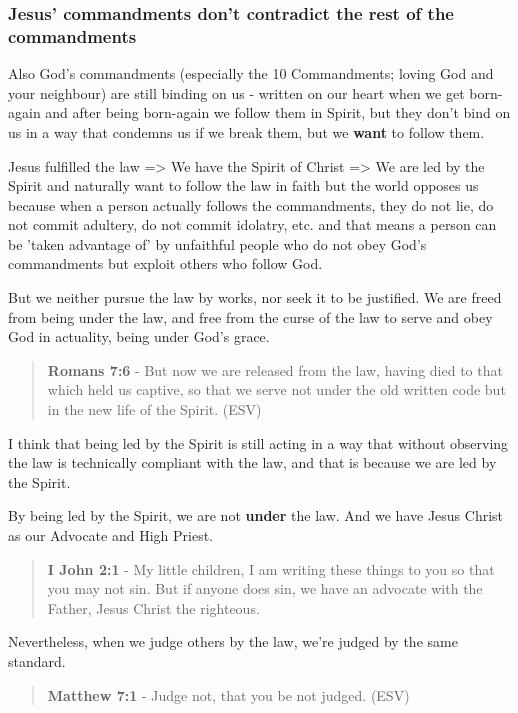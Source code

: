\documentclass[11pt]{article}
\begin{document}
\subsubsection{Jesus' commandments don't contradict the rest of the commandments}
\label{sec:org19095ba}
Also God's commandments (especially the 10 Commandments; loving God and your neighbour) are still binding on us - written on our heart when we get born-again and after being born-again we follow them in Spirit, but they don't bind on us in a way that condemns us if we  break them, but we \textbf{want} to follow them.

Jesus fulfilled the law => We have the Spirit of Christ => We are led by the Spirit and naturally want to follow the law in faith but the world opposes us because when a person actually follows the commandments, they do not lie, do not commit adultery, do not commit idolatry, etc. and that means a person can be 'taken advantage of' by unfaithful people who do not obey God's commandments but exploit others who follow God.

But we neither pursue the law by works, nor seek it to be justified.
We are freed from being under the law, and free from the curse of the law to serve and obey God in actuality, being under God's grace.

\begin{quote}
\textbf{Romans 7:6} - But now we are released from the law, having died to that which held us captive, so that we serve not under the old written code but in the new life of the Spirit. (ESV)
\end{quote}

I think that being led by the Spirit is still acting in a way that without observing the law is technically compliant with the law, and that is because we are led by the Spirit.

By being led by the Spirit, we are not \textbf{under} the law. And we have Jesus Christ as our Advocate and High Priest.

\begin{quote}
\textbf{I John 2:1} - My little children, I am writing these things to you so that you may not sin. But if anyone does sin, we have an advocate with the Father, Jesus Christ the righteous.
\end{quote}

Nevertheless, when we judge others by the law, we're judged by the same standard.

\begin{quote}
\textbf{Matthew 7:1} - Judge not, that you be not judged. (ESV)
\end{quote}
\end{document}

